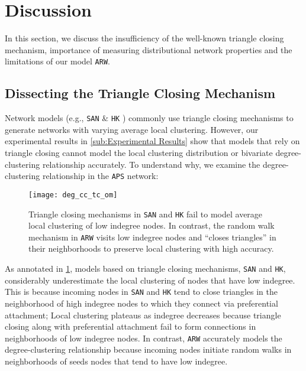 
\section{Discussion}
\label{sec:Discussion}
In this section, we discuss the insufficiency of the well-known triangle closing mechanism,
importance of measuring distributional network properties
and the limitations of our model \texttt{ARW}.

\subsection{Dissecting the Triangle Closing Mechanism}
\label{ss:tc}

Network models (e.g., \texttt{SAN} \cite{gong2012evolution} \& \texttt{HK} \cite{holme2002growing})
commonly use triangle closing mechanisms to generate networks with
varying average local clustering. However, our experimental results
in \cref{sub:Experimental Results} show that models that rely on triangle closing
cannot model the local clustering distribution or bivariate degree-clustering
relationship accurately. To understand why, we examine the degree-clustering
relationship in the \texttt{APS} network:
\vspace{-2mm}
\begin{figure}[H]
    \centering
    \texttt{[image: deg\_cc\_tc\_om]}
    \caption{Triangle closing mechanisms in \texttt{SAN} and \texttt{HK} fail to
    model average local clustering of low indegree nodes. In contrast, the random walk
    mechanism in \texttt{ARW} visits low indegree nodes and ``closes triangles'' in
    their neighborhoods to preserve local clustering with high accuracy.}
    \label{fig:triangle_closing}
\end{figure}

As annotated in \cref{fig:triangle_closing}, models based on triangle closing mechanisms,
\texttt{SAN} and \texttt{HK}, considerably underestimate the local clustering of
nodes that have low indegree. This is because incoming nodes in \texttt{SAN} and \texttt{HK}
tend to close triangles in the neighborhood of high indegree nodes to which they
connect via preferential attachment; Local clustering plateaus as indegree decreases because
triangle closing along with preferential attachment fail to form connections in neighborhoods
of low indegree nodes. In contrast, \texttt{ARW} accurately models the degree-clustering relationship
because incoming nodes initiate random walks in neighborhoods of seeds nodes that tend to have
low indegree.

